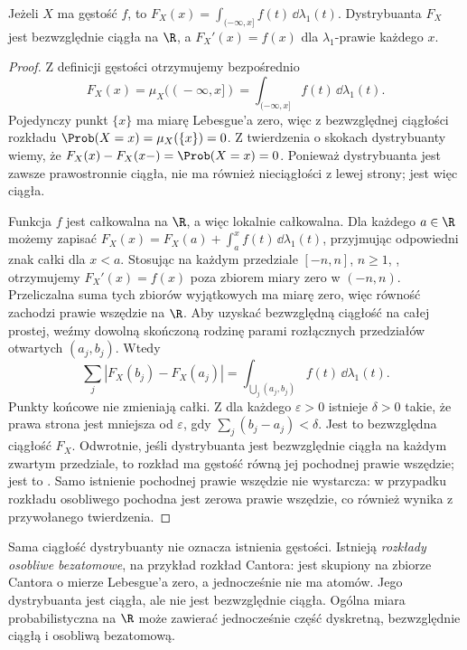 \begin{stwierdzenie}
Jeżeli $X$ ma gęstość $f$, to
$F_X(x)=\int_{(-\infty,x]} f(t)\,\dd\lambda_1(t)$.
Dystrybuanta $F_X$ jest bezwzględnie ciągła na $\R$,
a $F_X'(x)=f(x)$
dla $\lambda_1$-prawie każdego $x$.
\end{stwierdzenie}
\begin{proof}
Z definicji gęstości otrzymujemy bezpośrednio
\[
F_X(x)=\mu_X((\!-\infty,x])
=\int_{(-\infty,x]}f(t)\,\dd\lambda_1(t).
\]
Pojedynczy punkt $\{x\}$ ma miarę Lebesgue'a zero,
więc z bezwzględnej ciągłości rozkładu
$\Prob(X=x)=\mu_X(\{x\})=0$.
Z twierdzenia o skokach dystrybuanty wiemy,
że $F_X(x)-F_X(x-)=\Prob(X=x)=0$.
Ponieważ dystrybuanta jest zawsze prawostronnie ciągła,
nie ma również nieciągłości z lewej strony; jest więc ciągła.

Funkcja $f$ jest całkowalna na $\R$, a więc lokalnie
całkowalna. Dla każdego $a\in\R$ możemy zapisać
$F_X(x)=F_X(a)+\int_a^x f(t)\,\dd\lambda_1(t)$,
przyjmując odpowiedni znak całki dla $x<a$.
Stosując na każdym przedziale $[-n,n]$, $n\geq1$,
,
otrzymujemy $F_X'(x)=f(x)$ poza zbiorem miary zero
w $(-n,n)$. Przeliczalna suma tych zbiorów wyjątkowych ma
miarę zero, więc równość zachodzi prawie wszędzie na $\R$.
Aby uzyskać bezwzględną ciągłość na całej prostej, weźmy
dowolną skończoną rodzinę parami rozłącznych przedziałów
otwartych $(a_j,b_j)$. Wtedy
\[
\sum_j|F_X(b_j)-F_X(a_j)|
=\int_{\bigcup_j(a_j,b_j)} f(t)\,\dd\lambda_1(t).
\]
Punkty końcowe nie zmieniają całki. Z
dla każdego $\varepsilon>0$ istnieje $\delta>0$ takie,
że prawa strona jest mniejsza od $\varepsilon$, gdy
$\sum_j(b_j-a_j)<\delta$. Jest to bezwzględna ciągłość $F_X$.
Odwrotnie, jeśli dystrybuanta jest bezwzględnie ciągła
na każdym zwartym przedziale, to rozkład ma gęstość równą
jej pochodnej prawie wszędzie; jest to
.
Samo istnienie pochodnej prawie wszędzie nie wystarcza:
w przypadku rozkładu osobliwego pochodna jest zerowa
prawie wszędzie, co również wynika z przywołanego twierdzenia.
\end{proof}

\begin{uwaga}
Sama ciągłość dystrybuanty nie oznacza istnienia gęstości.
Istnieją \emph{rozkłady osobliwe bezatomowe}, na przykład rozkład
Cantora: jest skupiony na zbiorze Cantora o mierze Lebesgue'a zero,
a jednocześnie nie ma atomów. Jego dystrybuanta jest ciągła,
ale nie jest bezwzględnie ciągła. Ogólna miara probabilistyczna na $\R$
może zawierać jednocześnie część dyskretną, bezwzględnie ciągłą
i osobliwą bezatomową.
\end{uwaga}


